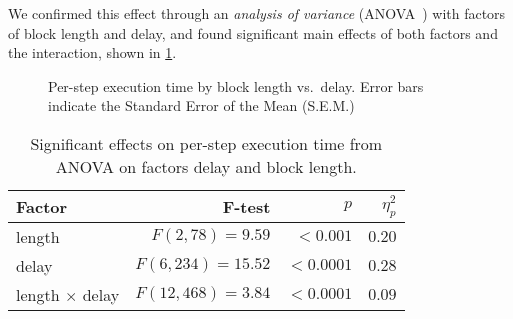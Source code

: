 We confirmed this effect through an \emph{analysis of variance} (ANOVA~\cite{FUJIKOSHI1993ANOVA}) with factors of block length and delay, and found significant main effects of both factors and the interaction, shown in \cref{tab:anova:exectime}.


\begin{figure}[h]
    \centering
    \caption{Per-step execution time by block length vs.\ delay. Error bars indicate the Standard Error of the Mean (S.E.M.)}\label{fig:exectime}%
\end{figure}

\begin{table}[h]
  \centering
  \caption{Significant effects on per-step execution time from ANOVA on factors delay and block length.}\label{tab:anova:exectime}
  \setlength{\tabcolsep}{0pt}%
  \begin{tabular*}{\columnwidth}{@{\extracolsep{\fill}\quad}lrrr@{}}
    \toprule
    \textbf{Factor} & \textbf{F-test} & \( p \) & \( \eta^{2}_{p} \) \\
    \midrule
    length         &    \(F(2, 78) = 9.59\) &   \(< 0.001\) &           \(0.20\) \\
    delay          &  \(F(6, 234) = 15.52\) &  \(< 0.0001\) &           \(0.28\) \\
    length \(\times\) delay &  \(F(12, 468) = 3.84\) &  \(< 0.0001\) &           \(0.09\) \\
    \bottomrule
  \end{tabular*}
\end{table}

